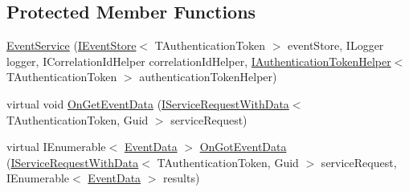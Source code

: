 \subsection*{Protected Member Functions}
\begin{DoxyCompactItemize}
\item 
\hyperlink{classCqrs_1_1Services_1_1EventService_ac5896c2eb4efbdb42b3cad774b688e45_ac5896c2eb4efbdb42b3cad774b688e45}{Event\+Service} (\hyperlink{interfaceCqrs_1_1Events_1_1IEventStore}{I\+Event\+Store}$<$ T\+Authentication\+Token $>$ event\+Store, I\+Logger logger, I\+Correlation\+Id\+Helper correlation\+Id\+Helper, \hyperlink{interfaceCqrs_1_1Authentication_1_1IAuthenticationTokenHelper}{I\+Authentication\+Token\+Helper}$<$ T\+Authentication\+Token $>$ authentication\+Token\+Helper)
\item 
virtual void \hyperlink{classCqrs_1_1Services_1_1EventService_a1556310c97fbf05df7804d53f91f8511_a1556310c97fbf05df7804d53f91f8511}{On\+Get\+Event\+Data} (\hyperlink{interfaceCqrs_1_1Services_1_1IServiceRequestWithData}{I\+Service\+Request\+With\+Data}$<$ T\+Authentication\+Token, Guid $>$ service\+Request)
\item 
virtual I\+Enumerable$<$ \hyperlink{classCqrs_1_1Events_1_1EventData}{Event\+Data} $>$ \hyperlink{classCqrs_1_1Services_1_1EventService_a16030e800b05cea77fd2183db7296804_a16030e800b05cea77fd2183db7296804}{On\+Got\+Event\+Data} (\hyperlink{interfaceCqrs_1_1Services_1_1IServiceRequestWithData}{I\+Service\+Request\+With\+Data}$<$ T\+Authentication\+Token, Guid $>$ service\+Request, I\+Enumerable$<$ \hyperlink{classCqrs_1_1Events_1_1EventData}{Event\+Data} $>$ results)
\end{DoxyCompactItemize}
